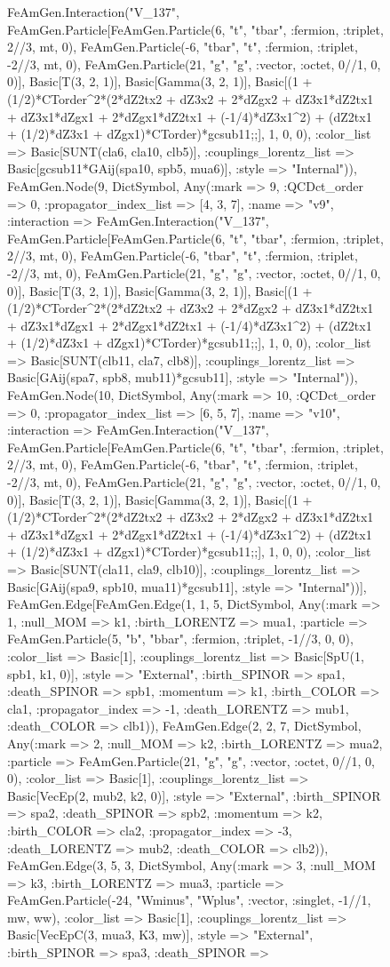 \documentclass{revtex4}
\begin{document}
\begin{figure}[!htb]
\begin{center}
{FeAmGen.Interaction("V_137", FeAmGen.Particle[FeAmGen.Particle(6, "t", "tbar", :fermion, :triplet, 2//3, mt, 0), FeAmGen.Particle(-6, "tbar", "t", :fermion, :triplet, -2//3, mt, 0), FeAmGen.Particle(21, "g", "g", :vector, :octet, 0//1, 0, 0)], Basic[T(3, 2, 1)], Basic[Gamma(3, 2, 1)], Basic[(1 + (1/2)*CTorder^2*(2*dZ2tx2 + dZ3x2 + 2*dZgx2 + dZ3x1*dZ2tx1 + dZ3x1*dZgx1 + 2*dZgx1*dZ2tx1 + (-1/4)*dZ3x1^2) + (dZ2tx1 + (1/2)*dZ3x1 + dZgx1)*CTorder)*gcsub11;;], 1, 0, 0), :color_list => Basic[SUNT(cla6, cla10, clb5)], :couplings_lorentz_list => Basic[gcsub11*GAij(spa10, spb5, mua6)], :style => "Internal")), FeAmGen.Node(9, Dict{Symbol, Any}(:mark => 9, :QCDct_order => 0, :propagator_index_list => [4, 3, 7], :name => "v9", :interaction => FeAmGen.Interaction("V_137", FeAmGen.Particle[FeAmGen.Particle(6, "t", "tbar", :fermion, :triplet, 2//3, mt, 0), FeAmGen.Particle(-6, "tbar", "t", :fermion, :triplet, -2//3, mt, 0), FeAmGen.Particle(21, "g", "g", :vector, :octet, 0//1, 0, 0)], Basic[T(3, 2, 1)], Basic[Gamma(3, 2, 1)], Basic[(1 + (1/2)*CTorder^2*(2*dZ2tx2 + dZ3x2 + 2*dZgx2 + dZ3x1*dZ2tx1 + dZ3x1*dZgx1 + 2*dZgx1*dZ2tx1 + (-1/4)*dZ3x1^2) + (dZ2tx1 + (1/2)*dZ3x1 + dZgx1)*CTorder)*gcsub11;;], 1, 0, 0), :color_list => Basic[SUNT(clb11, cla7, clb8)], :couplings_lorentz_list => Basic[GAij(spa7, spb8, mub11)*gcsub11], :style => "Internal")), FeAmGen.Node(10, Dict{Symbol, Any}(:mark => 10, :QCDct_order => 0, :propagator_index_list => [6, 5, 7], :name => "v10", :interaction => FeAmGen.Interaction("V_137", FeAmGen.Particle[FeAmGen.Particle(6, "t", "tbar", :fermion, :triplet, 2//3, mt, 0), FeAmGen.Particle(-6, "tbar", "t", :fermion, :triplet, -2//3, mt, 0), FeAmGen.Particle(21, "g", "g", :vector, :octet, 0//1, 0, 0)], Basic[T(3, 2, 1)], Basic[Gamma(3, 2, 1)], Basic[(1 + (1/2)*CTorder^2*(2*dZ2tx2 + dZ3x2 + 2*dZgx2 + dZ3x1*dZ2tx1 + dZ3x1*dZgx1 + 2*dZgx1*dZ2tx1 + (-1/4)*dZ3x1^2) + (dZ2tx1 + (1/2)*dZ3x1 + dZgx1)*CTorder)*gcsub11;;], 1, 0, 0), :color_list => Basic[SUNT(cla11, cla9, clb10)], :couplings_lorentz_list => Basic[GAij(spa9, spb10, mua11)*gcsub11], :style => "Internal"))], FeAmGen.Edge[FeAmGen.Edge(1, 1, 5, Dict{Symbol, Any}(:mark => 1, :null_MOM => k1, :birth_LORENTZ => mua1, :particle => FeAmGen.Particle(5, "b", "bbar", :fermion, :triplet, -1//3, 0, 0), :color_list => Basic[1], :couplings_lorentz_list => Basic[SpU(1, spb1, k1, 0)], :style => "External", :birth_SPINOR => spa1, :death_SPINOR => spb1, :momentum => k1, :birth_COLOR => cla1, :propagator_index => -1, :death_LORENTZ => mub1, :death_COLOR => clb1)), FeAmGen.Edge(2, 2, 7, Dict{Symbol, Any}(:mark => 2, :null_MOM => k2, :birth_LORENTZ => mua2, :particle => FeAmGen.Particle(21, "g", "g", :vector, :octet, 0//1, 0, 0), :color_list => Basic[1], :couplings_lorentz_list => Basic[VecEp(2, mub2, k2, 0)], :style => "External", :birth_SPINOR => spa2, :death_SPINOR => spb2, :momentum => k2, :birth_COLOR => cla2, :propagator_index => -3, :death_LORENTZ => mub2, :death_COLOR => clb2)), FeAmGen.Edge(3, 5, 3, Dict{Symbol, Any}(:mark => 3, :null_MOM => k3, :birth_LORENTZ => mua3, :particle => FeAmGen.Particle(-24, "Wminus", "Wplus", :vector, :singlet, -1//1, mw, ww), :color_list => Basic[1], :couplings_lorentz_list => Basic[VecEpC(3, mua3, K3, mw)], :style => "External", :birth_SPINOR => spa3, :death_SPINOR => }
\end{center}
\end{figure}
\end{document}
